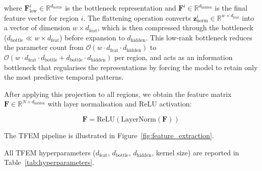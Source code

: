 \documentclass[a4paper,fleqn]{cas-dc}
\begin{document}
where $\mathbf{F}^i_{\text{low}} \in \mathbb{R}^{d_{\text{bottle}}}$ is the bottleneck representation and $\mathbf{F}^i \in \mathbb{R}^{d_{\text{hidden}}}$ is the final feature vector for region $i$. The flattening operation converts $\mathbf{z}^i_{\text{norm}} \in \mathbb{R}^{w \times d_{\text{feat}}}$ into a vector of dimension $w \times d_{\text{feat}}$, which is then compressed through the bottleneck ($d_{\text{bottle}} \ll w \times d_{\text{feat}}$) before expansion to $d_{\text{hidden}}$. This low-rank bottleneck reduces the parameter count from $\mathcal{O}(w \cdot d_{\text{feat}} \cdot d_{\text{hidden}})$ to $\mathcal{O}(w \cdot d_{\text{feat}} \cdot d_{\text{bottle}} + d_{\text{bottle}} \cdot d_{\text{hidden}})$ per region, and acts as an information bottleneck that regularises the representations by forcing the model to retain only the most predictive temporal patterns.

After applying this projection to all regions, we obtain the feature matrix $\mathbf{F} \in \mathbb{R}^{N \times d_{\text{hidden}}}$ with layer normalisation and ReLU activation:

\begin{equation}
\mathbf{F} = \text{ReLU}(\text{LayerNorm}(\mathbf{F}))
\end{equation}

The TFEM pipeline is illustrated in Figure~\ref{fig:feature_extraction}.

All TFEM hyperparameters ($d_{\text{feat}}$, $d_{\text{bottle}}$, $d_{\text{hidden}}$, kernel size) are reported in Table~\ref{tab:hyperparameters}.
\end{document}
